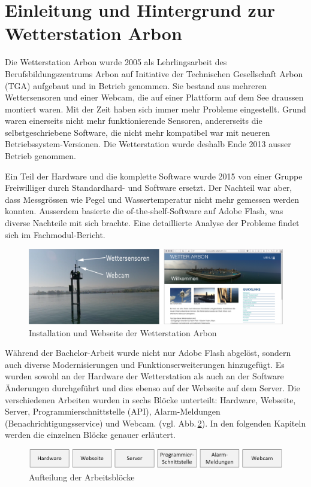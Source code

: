\section*{Einleitung und Hintergrund zur Wetterstation Arbon}

Die Wetterstation Arbon wurde 2005 als Lehrlingsarbeit des Berufsbildungszentrums Arbon auf Initiative der Technischen Gesellschaft Arbon (TGA) aufgebaut und in Betrieb genommen. Sie bestand aus mehreren Wettersensoren und einer Webcam, die auf einer Plattform auf dem See draussen montiert waren. Mit der Zeit haben sich immer mehr Probleme eingestellt. Grund waren einerseits nicht mehr funktionierende Sensoren, andererseits die selbstgeschriebene Software, die nicht mehr kompatibel war mit neueren Betriebssystem-Versionen. Die Wetterstation wurde deshalb Ende 2013 ausser Betrieb genommen.

Ein Teil der Hardware und die komplette Software wurde 2015 von einer Gruppe Freiwilliger durch Standardhard- und Software ersetzt. Der Nachteil war aber, dass Messgrössen wie Pegel und Wassertemperatur nicht mehr gemessen werden konnten. Ausserdem basierte die of-the-shelf-Software auf Adobe Flash, was diverse Nachteile mit sich brachte. Eine detaillierte Analyse der Probleme findet sich im Fachmodul-Bericht\cite{BilWie2018MUIu}.

\vspace{5mm} %
\begin{figure}[htbp!]
	\centering
	\includegraphics[width=1\linewidth]{img/kombi}
	\caption{Installation und Webseite der Wetterstation Arbon}
	\label{img:wetterstation}
\end{figure}
\vspace{3mm} %

\noindent
Während der Bachelor-Arbeit wurde nicht nur Adobe Flash abgelöst, sondern auch diverse Modernisierungen und Funktionserweiterungen hinzugefügt. Es wurden sowohl an der Hardware der Wetterstation als auch an der Software Änderungen durchgeführt und dies ebenso auf der Webseite auf dem Server. Die verschiedenen Arbeiten wurden in sechs Blöcke unterteilt: Hardware, Webseite, Server, Programmierschnittstelle (API), Alarm-Meldungen (Benachrichtigungsservice) und Webcam. (vgl. Abb.\,\ref{img:module}). In den folgenden Kapiteln werden die einzelnen Blöcke genauer erläutert.

\vspace{5mm} %
\begin{figure}[htbp!]
	\centering
	\includegraphics[width=1\linewidth]{img/module}
	\caption{Aufteilung der Arbeitsblöcke}
	\label{img:module}
\end{figure}
\newpage
